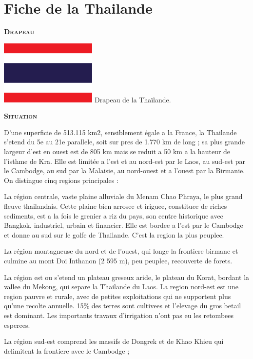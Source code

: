 \section{Fiche de la Thailande}

\begin{multicols}{2}

\textbf{\textsc{Drapeau}}

\hspace*{-0.65cm}
\includegraphics[width=4.8cm]{articles/Fiche-de-la-thailande/drapeau_thailande.png}
Drapeau de la Thaïlande.

\textbf{\textsc{Situation}}

D’une superficie de 513.115 km2, sensiblement égale a la France, la Thailande s’etend du 5e au 21e parallele, soit sur pres de 1.770 km de long ; sa plus grande largeur d’est en ouest est de 805 km mais se reduit a 50 km a la hauteur de l’isthme de Kra.
Elle est limitée a l’est et au nord-est par le Laos, au sud-est par le Cambodge, au sud par la Malaisie, au nord-ouest et a l’ouest par la Birmanie. On distingue cinq regions principales :

La région centrale, vaste plaine alluviale du Menam Chao Phraya, le plus grand fleuve thailandais. Cette plaine bien arrosee et iriguee, constituee de riches sediments, est a la fois le grenier a riz du pays, son centre historique avec Bangkok, industriel, urbain et financier. Elle est bordee a l’est par le Cambodge et donne au sud sur le golfe de Thailande. C’est la region la plus peuplee.

La région montagneuse du nord et de l’ouest, qui longe la frontiere birmane et culmine au mont Doi Inthanon (2 595 m), peu peuplee, recouverte de forets.

La région est ou s’etend un plateau greseux aride, le plateau du Korat, bordant la vallee du Mekong, qui separe la Thailande du Laos. La region nord-est est une region pauvre et rurale, avec de petites exploitations qui ne supportent plus qu’une recolte annuelle. 15\% des terres sont cultivees et l’elevage du gros betail est dominant. Les importants travaux d’irrigation n’ont pas eu les retombees esperees.

La région sud-est comprend les massifs de Dongrek et de Khao Khieu qui delimitent la frontiere avec le Cambodge ;


\end{multicols}
